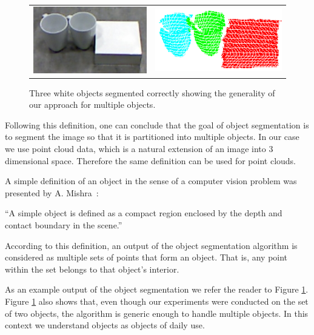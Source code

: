 \begin{figure}[ht]
\centering
\begin{tabular}{cccc}

\multicolumn{2}{c}{\includegraphics[width=0.45\columnwidth]{figures/3objects/after_push.jpg}}
& \multicolumn{2}{c}{\includegraphics[width=0.45\columnwidth]{figures/3objects/segmented.png}}

\end{tabular}
\caption{Three white objects segmented correctly showing the generality of our approach for multiple objects.}
\label{fig:three_objects}
\end{figure}


 Following this definition, one can conclude that the goal of object segmentation is to segment the image so that it is partitioned into multiple objects. In our case we use point cloud data, which is a natural extension of an image into 3 dimensional space. Therefore the same definition can be used for point clouds. 

A simple definition of an object in the sense of a computer vision problem was presented by A. Mishra~\cite{mishra2012segmenting}:

\noindent ``A simple object is defined as a compact region enclosed by the depth and
contact boundary in the scene.''

According to this definition, an output of the object segmentation algorithm is considered as multiple sets of points that form an object. That is, any point within the set belongs to that object's interior. 

As an example output of the object segmentation we refer the reader to Figure \ref{fig:three_objects}. Figure \ref{fig:three_objects} also shows that, even though our experiments were conducted on the set of two objects, the algorithm is generic enough to handle multiple objects. In this context we understand objects as objects of daily use.


